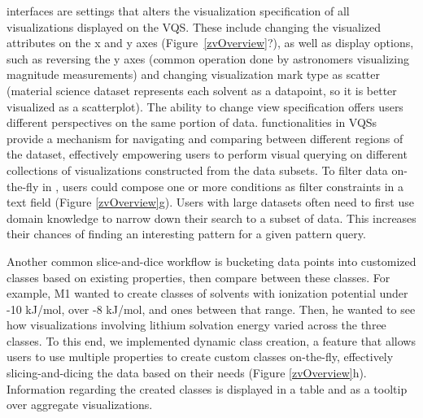  interfaces are settings that alters the visualization specification of all visualizations displayed on the VQS. These include changing the visualized attributes on the x and y axes (Figure~\ref{zvOverview}?), as well as display options, such as reversing the y axes (common operation done by astronomers visualizing magnitude measurements) and changing visualization mark type as scatter (material science dataset represents each solvent as a datapoint, so it is better visualized as a scatterplot). The ability to change view specification offers users different perspectives on the same portion of data.
 functionalities in VQSs provide a mechanism for navigating and comparing between different regions of the dataset, effectively empowering users to perform visual querying on different collections of visualizations constructed from the data subsets. To filter data on-the-fly in \zv, users could compose one or more conditions as filter constraints in a text field (Figure \ref{zvOverview}g). Users with large datasets often need to first use domain knowledge to narrow down their search to a subset of data. This increases their chances of finding an interesting pattern for a given pattern query. 
\par Another common slice-and-dice workflow is bucketing data points into customized classes based on existing properties, then compare between these classes. For example, M1 wanted to create classes of solvents with ionization potential under -10 kJ/mol, over -8 kJ/mol, and ones between that range. Then, he wanted to see how visualizations involving lithium solvation energy varied across the three classes. To this end, we implemented dynamic class creation, a feature that allows users to use multiple properties to create custom classes on-the-fly, effectively slicing-and-dicing the data based on their needs (Figure \ref{zvOverview}h). Information regarding the created classes is displayed in a table and as a tooltip over aggregate visualizations.
%
